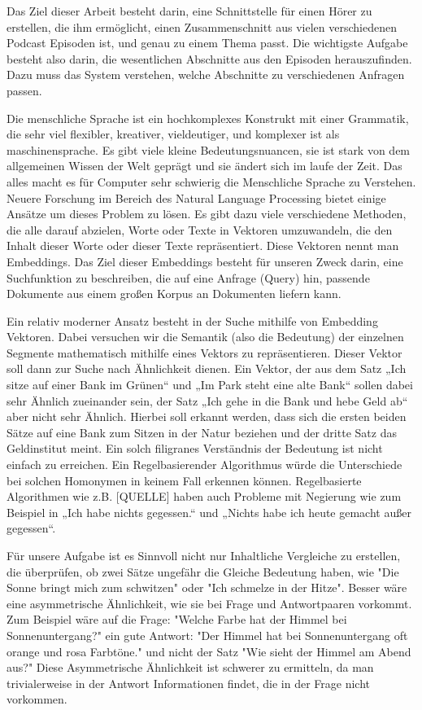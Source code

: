 Das Ziel dieser Arbeit besteht darin, eine Schnittstelle für einen Hörer zu erstellen, die ihm ermöglicht, einen Zusammenschnitt aus vielen verschiedenen Podcast Episoden ist, und genau zu einem Thema passt. 
Die wichtigste Aufgabe besteht also darin, die wesentlichen Abschnitte aus den Episoden herauszufinden. 
Dazu muss das System verstehen, welche Abschnitte zu verschiedenen Anfragen passen. 

Die menschliche Sprache ist ein hochkomplexes Konstrukt mit einer Grammatik, die sehr viel flexibler, kreativer, vieldeutiger, und komplexer ist als maschinensprache. 
Es gibt viele kleine Bedeutungsnuancen, sie ist stark von dem allgemeinen Wissen der Welt geprägt und sie ändert sich im laufe der Zeit. 
Das alles macht es für Computer sehr schwierig die Menschliche Sprache zu Verstehen. 
Neuere Forschung im Bereich des Natural Language Processing bietet einige Ansätze um dieses Problem zu lösen. 
Es gibt dazu viele verschiedene Methoden, die alle darauf abzielen, Worte oder Texte in Vektoren umzuwandeln, die den Inhalt dieser Worte oder dieser Texte repräsentiert.
Diese Vektoren nennt man Embeddings.
Das Ziel dieser Embeddings besteht für unseren Zweck darin, eine Suchfunktion zu beschreiben, die auf eine Anfrage (Query) hin, passende Dokumente aus einem großen Korpus an Dokumenten liefern kann.

Ein relativ moderner Ansatz besteht in der Suche mithilfe von Embedding Vektoren. 
Dabei versuchen wir die Semantik (also die Bedeutung) der einzelnen Segmente mathematisch mithilfe eines Vektors zu repräsentieren. 
Dieser Vektor soll dann zur Suche nach Ähnlichkeit dienen. Ein Vektor, der aus dem Satz „Ich sitze auf einer Bank im Grünen“ und „Im Park steht eine alte Bank“ sollen dabei sehr Ähnlich zueinander sein, der Satz „Ich gehe in die Bank und hebe Geld ab“ aber nicht sehr Ähnlich. 
Hierbei soll erkannt werden, dass sich die ersten beiden Sätze auf eine Bank zum Sitzen in der Natur beziehen und der dritte Satz das Geldinstitut meint. 
Ein solch filigranes Verständnis der Bedeutung ist nicht einfach zu erreichen. 
Ein Regelbasierender Algorithmus würde die Unterschiede bei solchen Homonymen in keinem Fall erkennen können. 
Regelbasierte Algorithmen wie z.B. [QUELLE] haben auch Probleme mit Negierung wie zum Beispiel in „Ich habe nichts gegessen.“ und „Nichts habe ich heute gemacht außer gegessen“.

Für unsere Aufgabe ist es Sinnvoll nicht nur Inhaltliche Vergleiche zu erstellen, die überprüfen, ob zwei Sätze ungefähr die Gleiche Bedeutung haben, wie "Die Sonne bringt mich zum schwitzen" oder "Ich schmelze in der Hitze".
Besser wäre eine asymmetrische Ähnlichkeit, wie sie bei Frage und Antwortpaaren vorkommt.
Zum Beispiel wäre auf die Frage: "Welche Farbe hat der Himmel bei Sonnenuntergang?" ein gute Antwort: "Der Himmel hat bei Sonnenuntergang oft orange und rosa Farbtöne."  und nicht der Satz "Wie sieht der Himmel am Abend aus?"
Diese Asymmetrische Ähnlichkeit ist schwerer zu ermitteln, da man trivialerweise in der Antwort Informationen findet, die in der Frage nicht vorkommen.

